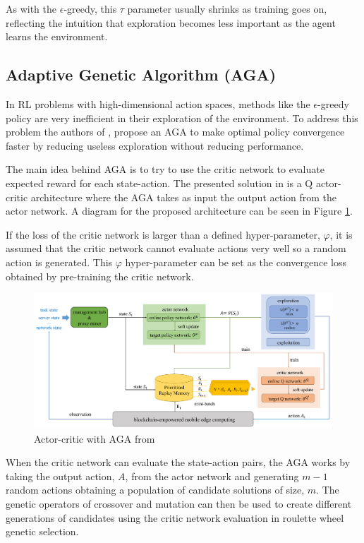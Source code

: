 As with the $\epsilon$-greedy, this $\tau$ parameter usually shrinks as training goes on, reflecting the intuition that exploration becomes less important as the agent learns the environment.

\subsection{Adaptive Genetic Algorithm (AGA)} \label{AGA}
\noindent In \acrshort{RL} problems with high-dimensional action spaces, methods like the $\epsilon$-greedy policy are very inefficient in their exploration of the environment. To address this problem the authors of \cite{AGAcrypto}, propose an \acrfull{AGA} to make optimal policy convergence faster by reducing useless exploration without reducing performance.

The main idea behind \acrshort{AGA} is to try to use the critic network to evaluate expected reward for each state-action. The presented solution in \cite{AGAcrypto} is a Q actor-critic architecture where the \acrshort{AGA} takes as input the output action from the actor network. A diagram for the proposed architecture can be seen in Figure \ref{AGAcryptoImag}.

If the loss of the critic network is larger than a defined hyper-parameter, $\varphi$, it is assumed that the critic network cannot evaluate actions very well so a random action is generated. This $\varphi$ hyper-parameter can be set as the convergence loss obtained by pre-training the critic network.

\begin{figure}[h]
  \centering
  \includegraphics[width=\textwidth]{images/AGA.png}
  \caption{Actor-critic with AGA from \cite{AGAcrypto}} \label{AGAcryptoImag}
\end{figure}

When the critic network can evaluate the state-action pairs, the \acrshort{AGA} works by taking the output action, $A$, from the actor network and generating $m-1$ random actions obtaining a population of candidate solutions of size, $m$. The genetic operators of crossover and mutation can then be used to create different generations of candidates using the critic network evaluation in roulette wheel genetic selection.

